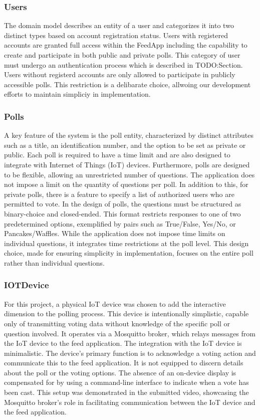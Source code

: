 \subsubsection{Users}
The domain model describes an entity of a user and categorizes it into two distinct types based on account registration status.  Users with registered accounts are granted full access within the FeedApp including the capability to create and participate in both public and private polls.  This category of user must undergo an authentication process which is described in TODO:Section.  Users without registerd accounts are only allowed to participate in publicly accessible  polls.  This restriction is a delibarate choice, allwoing our development efforts to maintain simpliciy in implementation.  

\subsubsection{Polls}
A key feature of the system is the poll entity, characterized by distinct attributes such as a title, an identification number, and the option to be set as private or public. Each poll is required to have a time limit and are also designed to integrate with Internet of Things (IoT) devices.  Furthermore, polls are designed to be flexible, allowing an unrestricted number of questions. The application does not impose a limit on the quantity of questions per poll.  In addition to this, for private polls, there is a feature to specify a list of authorized users who are permitted to vote. 
In the design of polls, the questions must be structured as binary-choice and closed-ended.  This format restricts responses to one of two predetermined options, exemplified by pairs such as True/False, Yes/No, or Pancakes/Waffles.  While the application does not impose time limits on individual questions, it integrates time restrictions at the poll level.  This design choice, made for ensuring simplicity in implementation, focuses on the entire poll rather than individual questions.

\subsubsection{IOTDevice}
For this project, a physical IoT device was chosen to add the interactive dimension to the polling process.  This device is intentionally simplistic, capable only of transmitting voting data without knowledge of the specific poll or question involved.  It operates via a Mosquitto broker, which relays messages from the IoT device to the feed application. The integration with the IoT device is minimalistic. The device's primary function is to acknowledge a voting action and communicate this to the feed application. It is not equipped to discern details about the poll or the voting options. The absence of an on-device display is compensated for by using a command-line interface to indicate when a vote has been cast. This setup was demonstrated in the submitted video, showcasing the Mosquitto broker's role in facilitating communication between the IoT device and the feed application.

